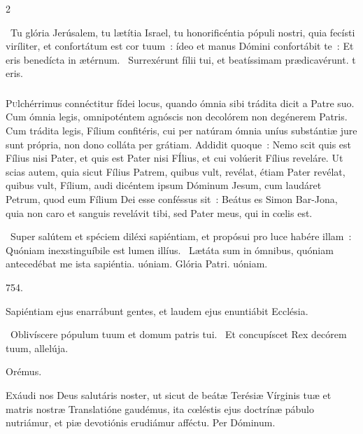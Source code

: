 \documentclass[9pt,twoside]{extarticle}
\begin{document}
\begin{multicols}{2}
\begin{tightlist}{}
\item {}~Tu glória Jerúsalem, tu lætítia Israel, tu honorificéntia pópuli nostri, quia fecísti viríliter, et confortátum est cor tuum~: ídeo et manus Dómini confortábit te~: \textred{*} Et eris benedícta in ætérnum. ~Surrexérunt fílii tui, et beatíssimam prædicavérunt. t eris.
\end{tightlist}

\subsubsection*{\center {}}
\lettrine{P}ulchérrimus connéctitur fídei locus, quando ómnia sibi trádita dicit a Patre suo. Cum ómnia legis, omnipoténtem agnóscis non decolórem non degénerem Patris. Cum trádita legis, Fílium confitéris, cui per natúram ómnia uníus substántiæ jure sunt própria, non dono colláta per grátiam. Addidit quoque~: Nemo scit quis est Fílius nisi Pater, et quis est Pater nisi FÍlius, et cui volúerit Fílius reveláre. Ut scias autem, quia sicut Fílius Patrem, quibus vult, revélat, étiam Pater revélat, quibus vult, Fílium, audi dicéntem ipsum Dóminum Jesum, cum laudáret Petrum, quod eum Fílium Dei esse conféssus sit~: Beátus es Simon Bar-Jona, quia non caro et sanguis revelávit tibi, sed Pater meus, qui in cœlis est.

\begin{tightlist}{}
\item {}~Super salútem et spéciem diléxi sapiéntiam, et propósui pro luce habére illam~: \textred{*} Quóniam inexstinguíbile est lumen illíus. ~Lætáta sum in ómnibus, quóniam antecedébat me ista sapiéntia. uóniam. Glória Patri. uóniam.
\item {}
\item {} 754. 
\item {} Sapiéntiam ejus enarrábunt gentes, et laudem ejus enuntiábit Ecclésia.
\item {}~Oblivíscere pópulum tuum et domum patris tui. ~Et concupíscet Rex decórem tuum, allelúja.
\item Orémus. \hfill {}
\end{tightlist}
\lettrine{E}xáudi nos Deus salutáris noster, ut sicut de beátæ Terésiæ Vírginis tuæ et matris nostræ Translatióne gaudémus, ita cœléstis ejus doctrínæ pábulo nutriámur, et piæ devotiónis erudiámur afféctu. Per Dóminum.


\end{multicols}
\end{document}

